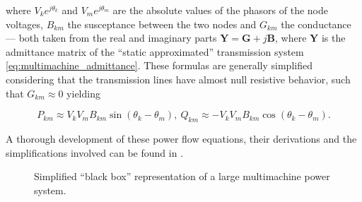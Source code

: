 	\noindent where $V_ke^{j\theta_k}$ and $V_me^{j\theta_m}$ are the absolute values of the phasors of the node voltages, $B_{km}$ the susceptance between the two nodes and $G_{km}$ the conductance — both taken from the real and imaginary parts $\mathbf{Y} = \mathbf{G} +  j\mathbf{B}$, where $\mathbf{Y}$ is the admittance matrix of the ``static approximated'' transmission system \ref{eq:multimachine_admittance}. These formulas are generally simplified considering that the transmission lines have almost null resistive behavior, such that $G_{km}\approx 0$ yielding

\begin{equation} P_{km} \approx V_kV_m B_{km} \sin\left(\theta_k - \theta_m\right),\ Q_{km} \approx - V_kV_m B_{km} \cos\left(\theta_k - \theta_m\right). \label{eq:approx_power_flow_eqs}\end{equation}

	A thorough development of these power flow equations, their derivations and the simplifications involved can be found in \cite{Monticelli1999}.

\begin{figure}[h]
\centering
	\caption{Simplified ``black box'' representation of a large multimachine power system.}
	\label{fig:large_eps}
\end{figure} %

